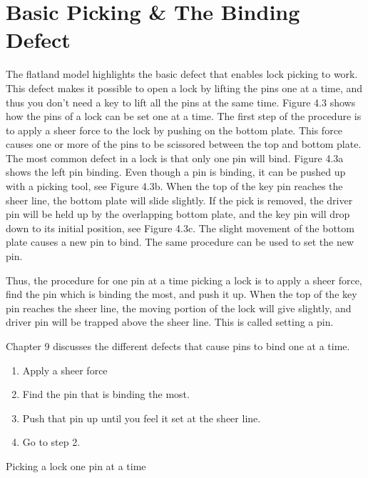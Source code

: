 \chapter{Basic Picking \& The Binding Defect}

The flatland model highlights the basic defect that enables lock picking to work. This defect
makes it possible to open a lock by lifting the pins one at a time, and thus you don't need a
key to lift all the pins at the same time. Figure 4.3 shows how the pins of a lock can be set
one at a time. The first step of the procedure is to apply a sheer force to the lock by pushing
on the bottom plate. This force causes one or more of the pins to be scissored between the
top and bottom plate. The most common defect in a lock is that only one pin will bind.
Figure 4.3a shows the left pin binding. Even though a pin is binding, it can be pushed up
with a picking tool, see Figure 4.3b. When the top of the key pin reaches the sheer line,
the bottom plate will slide slightly. If the pick is removed, the driver pin will be held up
by the overlapping bottom plate, and the key pin will drop down to its initial position, see
Figure 4.3c. The slight movement of the bottom plate causes a new pin to bind. The same
procedure can be used to set the new pin.

Thus, the procedure for one pin at a time picking a lock is to apply a sheer force, find
the pin which is binding the most, and push it up. When the top of the key pin reaches the
sheer line, the moving portion of the lock will give slightly, and driver pin will be trapped
above the sheer line. This is called setting a pin.

Chapter 9 discusses the different defects that cause pins to bind one at a time.

\begin{table}
    \begin{enumerate}
        \item Apply a sheer force
        \item Find the pin that is binding the most.
        \item Push that pin up until you feel it set at the sheer line.
        \item Go to step 2.
    \end{enumerate}
    \caption{Picking a lock one pin at a time}
\end{table}
